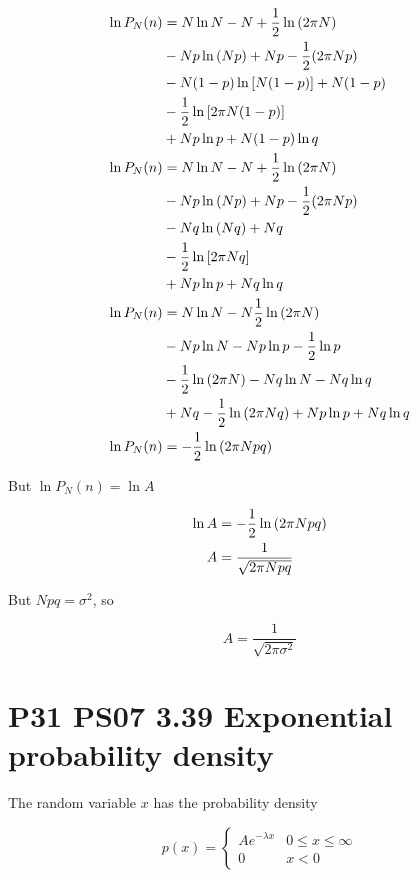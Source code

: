 \documentclass[9pt,a4paper,twocolumn]{article}
\begin{document}
\begin{align}
	\ln P_N(n) &= N \ln N - N + \frac{1}{2}\ln\qty(2\pi N) \nonumber \\
	&- Np\ln\qty(Np) + Np - \frac{1}{2}\qty(2\pi Np) \nonumber \\
	&- N(1-p)\ln\qty[N(1-p)] + N(1-p) \nonumber \\
	&- \frac{1}{2}\ln\qty[2\pi N(1-p)] \nonumber \\
	&+ Np\ln p + N(1-p)\ln q \\
	\ln P_N(n) &= N \ln N - N + \frac{1}{2}\ln\qty(2\pi N) \nonumber \\
	&- Np\ln\qty(Np) + Np - \frac{1}{2}\qty(2\pi Np) \nonumber \\
	&- Nq\ln\qty(Nq) + Nq \nonumber \\
	&- \frac{1}{2}\ln\qty[2\pi Nq] \nonumber \\
	&+ Np\ln p + Nq\ln q \\
	\ln P_N(n) &= N\ln N - N\frac{1}{2}\ln\qty(2\pi N) \nonumber \\
	&- Np\ln N - Np \ln p - \frac{1}{2}\ln p \nonumber \\
	&- \frac{1}{2}\ln\qty(2\pi N) - Nq\ln N - Nq\ln q \nonumber \\
	&+ Nq -\frac{1}{2}\ln\qty(2\pi Nq) + Np\ln p + Nq\ln q \\
	\ln P_N(n) &= -\frac{1}{2}\ln\qty(2\pi Npq)
\end{align}

But $\ln P_N(n) = \ln A$

\begin{align}
	\ln A &= -\frac{1}{2}\ln\qty(2\pi Npq) \\
	A &= \frac{1}{\sqrt{2\pi Npq}}
\end{align}

But $Npq = \sigma^2$, so

\begin{equation}
	\boxed{
		A = \frac{1}{\sqrt{2\pi\sigma^2}}
	}
\end{equation}

\section{P31 PS07 3.39 Exponential probability density}

The random variable $x$ has the probability density

\begin{equation}\label{eq:3.39-given}
	p(x) =
	\begin{cases}
		Ae^{-\lambda x} & 0 \leq x \leq \infty \\
		0 & x < 0
	\end{cases}
\end{equation}
\end{document}
